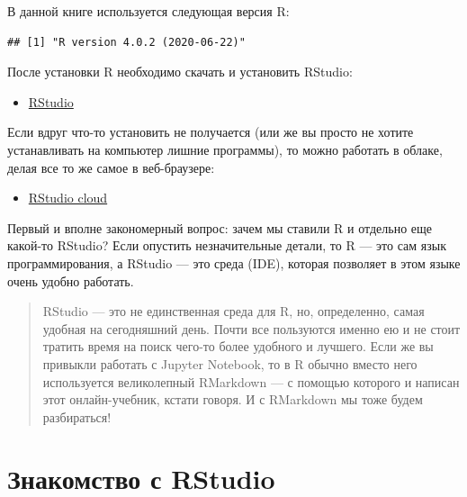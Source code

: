 \documentclass[]{book}
\newenvironment{Shaded}{\begin{snugshade}}{\end{snugshade}}
\newcommand{\KeywordTok}[1]{\textcolor[rgb]{0.13,0.29,0.53}{\textbf{#1}}}
\newcommand{\OperatorTok}[1]{\textcolor[rgb]{0.81,0.36,0.00}{\textbf{#1}}}
\newcommand{\NormalTok}[1]{#1}
\providecommand{\tightlist}{%
  \setlength{\itemsep}{0pt}\setlength{\parskip}{0pt}}
\begin{document}
В данной книге используется следующая версия R:

\begin{Shaded}
\end{Shaded}

\begin{verbatim}
## [1] "R version 4.0.2 (2020-06-22)"
\end{verbatim}

После установки R необходимо скачать и установить RStudio:

\begin{itemize}
\tightlist
\item
  \href{https://www.rstudio.com/products/rstudio/download/}{RStudio}
\end{itemize}

Если вдруг что-то установить не получается (или же вы просто не хотите
устанавливать на компьютер лишние программы), то можно работать в
облаке, делая все то же самое в веб-браузере:

\begin{itemize}
\tightlist
\item
  \href{https://rstudio.cloud/}{RStudio cloud}
\end{itemize}

Первый и вполне закономерный вопрос: зачем мы ставили R и отдельно еще
какой-то RStudio? Если опустить незначительные детали, то R --- это сам
язык программирования, а RStudio --- это среда (IDE), которая позволяет
в этом языке очень удобно работать.

\begin{quote}
RStudio --- это не единственная среда для R, но, определенно, самая
удобная на сегодняшний день. Почти все пользуются именно ею и не стоит
тратить время на поиск чего-то более удобного и лучшего. Если же вы
привыкли работать с Jupyter Notebook, то в R обычно вместо него
используется великолепный RMarkdown --- с помощью которого и написан
этот онлайн-учебник, кстати говоря. И с RMarkdown мы тоже будем
разбираться!
\end{quote}

\section{Знакомство с RStudio}\label{rstudio}
\end{document}
